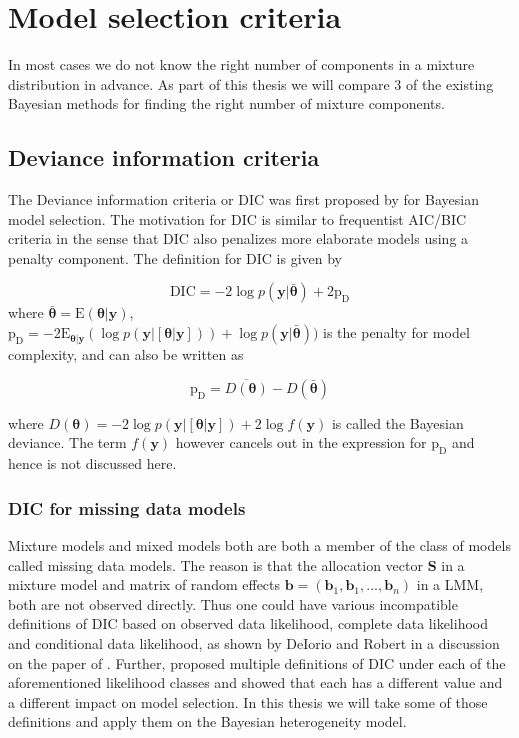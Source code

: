 \chapter{Model selection criteria}
\label{ch : model_selection}

In most cases we do not know the right number of components in a mixture distribution in advance. As part of this thesis we will compare 3 of the existing Bayesian methods for finding the right number of mixture components.

\section{Deviance information criteria}
\label{sec : dic}

The Deviance information criteria or DIC was first proposed by \citet{spiegelhalter_bayesian_2002} for Bayesian model selection. The motivation for DIC is similar to frequentist AIC/BIC criteria in the sense that DIC also penalizes more elaborate models using a penalty component. The definition for DIC is given by 

$$\text{DIC} = -2\log{p(\boldsymbol{y}|\boldsymbol{\bar{\theta}})} + 2\text{p}_\text{D}$$
where $\boldsymbol{\bar{\theta}} = \text{E}(\boldsymbol{\theta}|\boldsymbol{y})$,\\
$\text{p}_\text{D} = -2\text{E}_{\boldsymbol{\theta}|\boldsymbol{y}}(\log{p(\boldsymbol{y}|[\boldsymbol{\theta}|\boldsymbol{y}])}) + \log{p(\boldsymbol{y}|\boldsymbol{\bar{\theta}})})$ is the penalty for model complexity, and can also be written as 

$$\text{p}_\text{D}=\overline{D(\boldsymbol{\theta})} - D(\boldsymbol{\bar{\theta}})$$

where $D(\boldsymbol{\theta}) = -2\log{p(\boldsymbol{y}|[\boldsymbol{\theta}|\boldsymbol{y}])} + 2\log{f(\boldsymbol{y})}$ is called the Bayesian deviance. The term $f(\boldsymbol{y})$ however cancels out in the expression for $\text{p}_\text{D}$ and hence is not discussed here.

\subsection{DIC for missing data models}
\label{subsec : DIC_missing_data_models}
Mixture models and mixed models both are both a member of the class of models called missing data models. The reason is that the allocation vector $\boldsymbol{S}$ in a mixture model and matrix of random effects $\boldsymbol{b}=(\boldsymbol{b}_1, \boldsymbol{b}_1, ..., \boldsymbol{b}_n)$ in a LMM, both are not observed directly. Thus one could have various incompatible definitions of DIC based on observed data likelihood, complete data likelihood and conditional data likelihood, as shown by DeIorio and Robert in a discussion on the paper of \citet{spiegelhalter_bayesian_2002}. Further, \citet{celeux_deviance_2006} proposed multiple definitions of DIC under each of the aforementioned likelihood classes and showed that each has a different value and a different impact on model selection. In this thesis we will take some of those definitions and apply them on the Bayesian heterogeneity model. 

